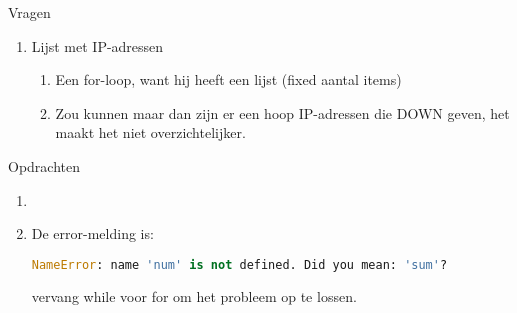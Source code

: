 Vragen
\begin{enumerate}
\item Lijst met IP-adressen
	\begin{enumerate}
	\item Een for-loop, want hij heeft een lijst (fixed aantal items)
	\item Zou kunnen maar dan zijn er een hoop IP-adressen die DOWN geven, het maakt het niet overzichtelijker.
	\end{enumerate}
\end{enumerate}

Opdrachten
\begin{enumerate}
\item 
\item De error-melding is:
\begin{lstlisting}[language=python]
NameError: name 'num' is not defined. Did you mean: 'sum'?
\end{lstlisting}
vervang while voor for om het probleem op te lossen.
\end{enumerate}

